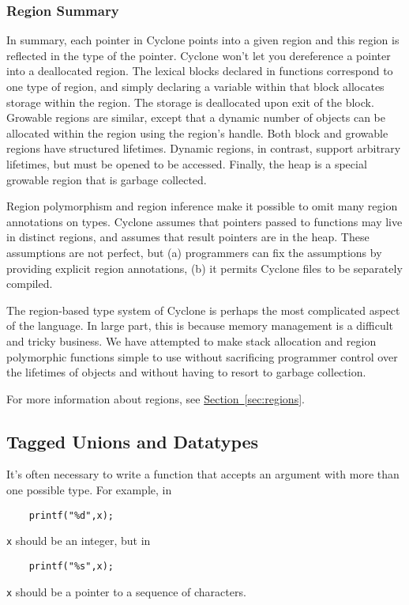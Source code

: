 \subsubsection*{Region Summary}

In summary, each pointer in Cyclone points into a given region
and this region is reflected in the type of the pointer.  Cyclone
won't let you dereference a pointer into a deallocated region.
The lexical blocks declared in functions correspond to one
type of region, and simply declaring a variable within that
block allocates storage within the region.  The storage is
deallocated upon exit of the block.  Growable regions are
similar, except that a dynamic number of objects can be allocated
within the region using the region's handle.  Both block
and growable regions have structured lifetimes.  Dynamic
regions, in contrast, support arbitrary lifetimes, but
must be opened to be accessed.  Finally, the heap is a
special growable region that is garbage collected.  

Region polymorphism and region inference make it possible to omit many
region annotations on types.  Cyclone assumes that pointers passed to
functions may live in distinct regions, and assumes that result
pointers are in the heap.  These assumptions are not perfect, but (a)
programmers can fix the assumptions by providing explicit region
annotations, (b) it permits Cyclone files to be separately compiled.

The region-based type system of Cyclone is perhaps the most
complicated aspect of the language.  In large part, this is
because memory management is a difficult and tricky business.
We have attempted to make stack allocation and region polymorphic
functions simple to use without sacrificing programmer control
over the lifetimes of objects and without having to resort to
garbage collection.  

For more information about regions, see
\hyperref[{sec:regions}]{Section~\ref{sec:regions}}.

\subsection{Tagged Unions and Datatypes}

It's often necessary to write a function that accepts an argument with
more than one possible type.  For example, in
\begin{verbatim}
    printf("%d",x);
\end{verbatim}
\texttt{x} should be an integer, but in
\begin{verbatim}
    printf("%s",x);
\end{verbatim}
\texttt{x} should be a pointer to a sequence of characters.


